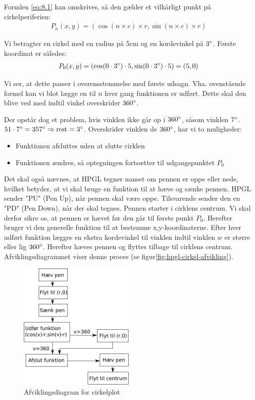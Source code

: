 Formlen \vref{eq:8.1} kan omskrives, så den gælder et vilkårligt punkt
på cirkelperiferien:
\begin{align}
P_n(x, y)=(\cos(n\times c)\times r, \sin(n\times c)\times r)
\end{align}

Vi betragter en cirkel med en radius på 5cm og en kordevinkel på
$3^\circ$. Første koordinat er således:
\begin{align*}
P_0(x, y)&=(\cos(0\cdot 3^\circ)\cdot 5 , \sin(0\cdot 3^\circ)\cdot 5)=(5, 0) \\
\end{align*}

Vi ser, at dette passer i overensstemmelse med første
udsagn. Vha. ovenstående formel kan vi blot lægge en til $n$ hver gang
funktionen er udført. Dette skal den blive ved med indtil vinkel
overskrider $360^\circ$.


Der opstår dog et problem, hvis vinklen ikke går op i $360^\circ$,
såsom vinklen $7^\circ$. $51\cdot 7^\circ = 357^\circ \Rightarrow
\textup{rest} = 3^\circ$. Overskrider vinklen de $360^\circ$, har vi to
muligheder:
\begin{itemize} \firmlist
\item Funktionen afsluttes uden at slutte cirklen
\item Funktionen ændres, så optegningen fortsætter til udgangspunktet $P_0$
\end{itemize}
Det skal også nævnes, at HPGL tegner uanset om pennen er oppe eller
nede, hvilket betyder, at vi skal bruge en funktion til at hæve og
sænke pennen. HPGL sender "PU" (Pen Up), når pennen skal være
oppe. Tilsvarende sender den en "PD" (Pen Down), når der skal
tegnes. Pennen starter i cirklens centrum. Vi skal derfor sikre os, at
pennen er hævet før den går til første punkt $P_0$. Herefter bruger vi
den generelle funktion til at bestemme x,y-koordinaterne. Efter hver
udført funktion lægges en ekstra kordevinkel til vinklen indtil
vinklen $w$ er større eller lig $360^\circ$. Herefter hæves pennen og
flyttes tilbage til cirklens centrum. Afviklingsdiagrammet viser denne
proces (se figur\vref{fig:hpgl-cirkel-afvikling}).

\begin{figure}[htbp]
  \centering
  \includegraphics[width=0.5\textwidth]{./img/afviklingsdiagram-cirkel}
  \caption{Afviklingsdiagram for cirkelplot}
  \label{fig:hpgl-cirkel-afvikling}
\end{figure}


